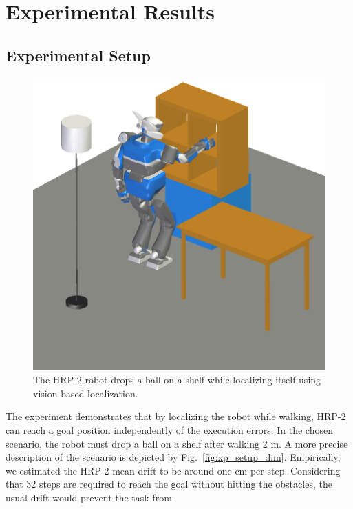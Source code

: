 \section{Experimental Results}\label{sec:results}

\subsection{Experimental Setup}\label{sec:xp_setup}
%
\begin{figure}[ht!] %
  \begin{center}
    \includegraphics[width=\linewidth]{images/trajectory-8.png}
  \end{center}
  \caption{The HRP-2 robot drops a ball on a shelf while localizing
    itself using vision based localization. \label{fig:xp_setup_screenshot}}
\end{figure}
%
The experiment demonstrates that by localizing the robot while walking, HRP-2 can reach a goal position independently of the
execution errors. In the chosen scenario, the robot must drop a ball on a shelf after walking 2 m. A more precise description of the
scenario is depicted by Fig.~\ref{fig:xp_setup_dim}. Empirically, we estimated the HRP-2 mean drift to be around one cm per
step. Considering that 32 steps are required to reach the goal without hitting the obstacles, the usual drift would prevent the task from
